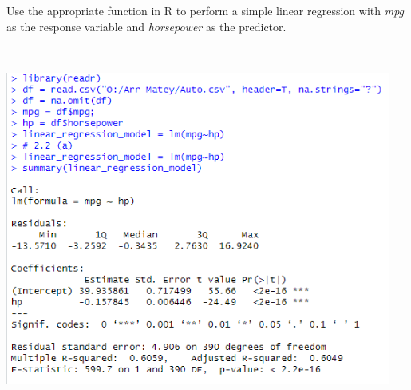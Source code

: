 Use the appropriate function in R to perform a simple linear regression with \textit{mpg} as
the response variable and \textit{horsepower} as the predictor.

\soln*  $ $

\nl \includegraphics*[width=5in]{img/2_2a_console.PNG}